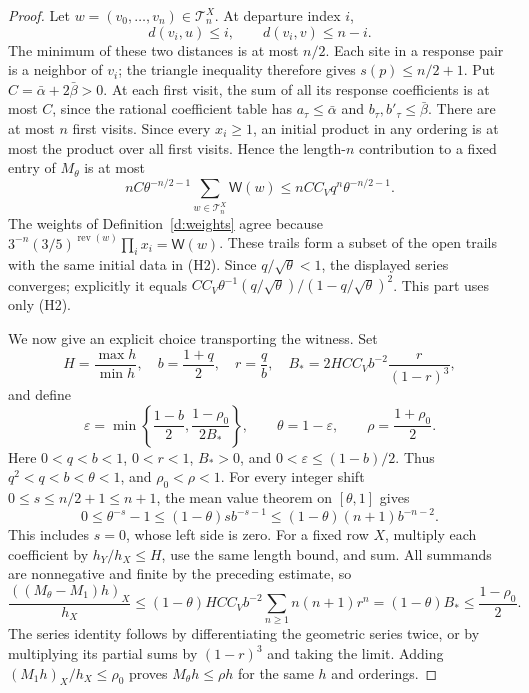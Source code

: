 \begin{proof}
Let \(w=(v_0,\ldots,v_n)\in\mathcal T_n^X\).  At departure
index \(i\),
\[
 d(v_i,u)\le i,\qquad d(v_i,v)\le n-i.
\]
The minimum of these two distances is at most \(n/2\).  Each
site in a response pair is a neighbor of \(v_i\); the triangle
inequality therefore gives \(s(p)\le n/2+1\).
Put \(C=\bar\alpha+2\bar\beta>0\).  At each first visit, the
sum of all its response coefficients is at most \(C\), since
the rational coefficient table has \(a_\tau\le\bar\alpha\) and
\(b_\tau,b'_\tau\le\bar\beta\).  There are at most \(n\) first
visits.  Since every \(x_i\ge1\), an initial product in any
ordering is at most the product over all first visits.  Hence
the length-\(n\) contribution to a fixed entry of \(M_\theta\)
is at most
\[
 nC\theta^{-n/2-1}
       \sum_{w\in\mathcal T_n^X}\mathsf W(w)
       \le nCC_Vq^n\theta^{-n/2-1}.
\]
The weights of Definition~\ref{d:weights} agree because
\(3^{-n}(3/5)^{\operatorname{rev}(w)}\prod_i x_i
 =\mathsf W(w)\).  These trails form a subset of the open trails
with the same initial data in (H2).  Since
\(q/\sqrt\theta<1\), the displayed series converges; explicitly
it equals
\(CC_V\theta^{-1}(q/\sqrt\theta)/(1-q/\sqrt\theta)^2\).
This part uses only (H2).

We now give an explicit choice transporting the witness.  Set
\[
 H=\frac{\max h}{\min h},\quad
 b=\frac{1+q}{2},\quad r=\frac qb,\quad
 B_*=2HCC_Vb^{-2}\frac{r}{(1-r)^3},
\]
and define
\begin{equation}\label{e:rec-shift-choice}
 \varepsilon=\min\left\{\frac{1-b}{2},
                         \frac{1-\rho_0}{2B_*}\right\},
 \qquad \theta=1-\varepsilon,\qquad
 \rho=\frac{1+\rho_0}{2}.
\end{equation}
Here \(0<q<b<1\), \(0<r<1\), \(B_*>0\), and
\(0<\varepsilon\le(1-b)/2\).  Thus
\(q^2<q<b<\theta<1\), and \(\rho_0<\rho<1\).
For every integer shift \(0\le s\le n/2+1\le n+1\),
the mean value theorem on \([\theta,1]\) gives
\[
 0\le\theta^{-s}-1
     \le(1-\theta)s b^{-s-1}
     \le(1-\theta)(n+1)b^{-n-2}.
\]
This includes \(s=0\), whose left side is zero.
For a fixed row \(X\), multiply each coefficient by
\(h_Y/h_X\le H\), use the same length bound, and sum.  All
summands are nonnegative and finite by the preceding estimate, so
\[
 \frac{((M_\theta-M_1)h)_X}{h_X}
 \le (1-\theta)HCC_Vb^{-2}
                  \sum_{n\ge1}n(n+1)r^n
 = (1-\theta)B_*\le\frac{1-\rho_0}{2}.
\]
The series identity follows by differentiating the geometric series
twice, or by multiplying its partial sums by \((1-r)^3\) and
taking the limit.  Adding \((M_1h)_X/h_X\le\rho_0\) proves
\(M_\theta h\le\rho h\) for the same \(h\) and orderings.
\end{proof}

